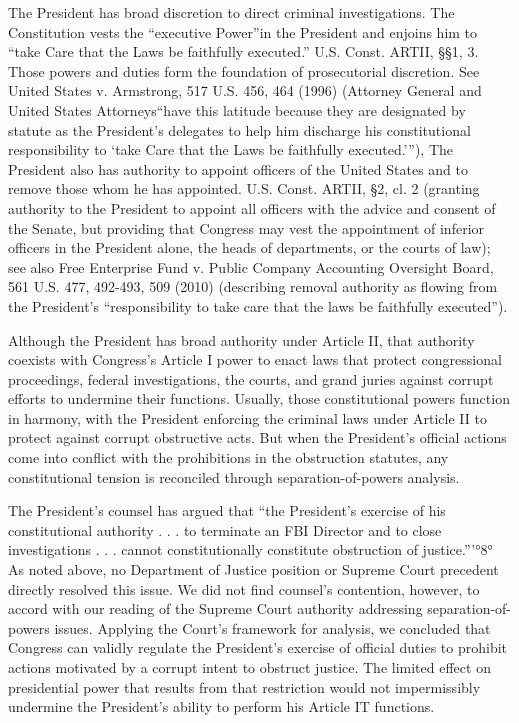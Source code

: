 The President has broad discretion to direct criminal investigations. The Constitution vests
the “executive Power”in the President and enjoins him to “take Care that the Laws be faithfully
executed.” U.S. Const. ARTII, \S\S 1, 3. Those powers and duties form the foundation of
prosecutorial discretion. See United States v. Armstrong, 517 U.S. 456, 464 (1996) (Attorney
General and United States Attorneys“have this latitude because they are designated by statute as
the President’s delegates to help him discharge his constitutional responsibility to ‘take Care that
the Laws be faithfully executed.’”), The President also has authority to appoint officers of the
United States and to remove those whom he has appointed. U.S. Const. ARTII, \S 2, cl. 2 (granting
authority to the President to appoint all officers with the advice and consent of the Senate, but
providing that Congress may vest the appointment of inferior officers in the President alone, the
heads of departments, or the courts of law); see also Free Enterprise Fund v. Public Company
Accounting Oversight Board, 561 U.S. 477, 492-493, 509 (2010) (describing removal authority as
flowing from the President’s “responsibility to take care that the laws be faithfully executed”).

Although the President has broad authority under Article II, that authority coexists with
Congress’s Article I power to enact laws that protect congressional proceedings, federal
investigations, the courts, and grand juries against corrupt efforts to undermine their functions.
Usually, those constitutional powers function in harmony, with the President enforcing the
criminal laws under Article II to protect against corrupt obstructive acts. But when the President’s
official actions come into conflict with the prohibitions in the obstruction statutes, any
constitutional tension is reconciled through separation-of-powers analysis.

The President’s counsel has argued that “the President’s exercise of his constitutional
authority . . . to terminate an FBI Director and to close investigations . . . cannot constitutionally
constitute obstruction of justice.”'°8° As noted above, no Department of Justice position or
Supreme Court precedent directly resolved this issue. We did not find counsel’s contention,
however, to accord with our reading of the Supreme Court authority addressing separation-of-powers issues. Applying the Court’s framework for analysis, we concluded that Congress can
validly regulate the President’s exercise of official duties to prohibit actions motivated by a corrupt
intent to obstruct justice. The limited effect on presidential power that results from that restriction
would not impermissibly undermine the President’s ability to perform his Article IT functions.

